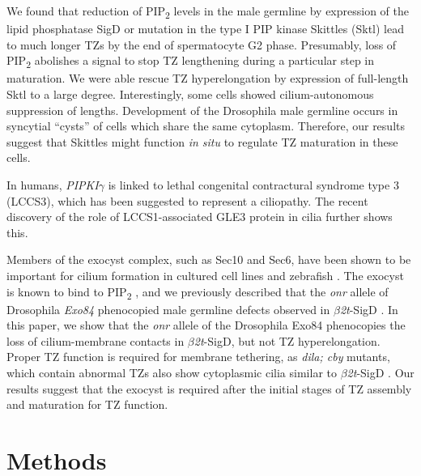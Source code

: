 \documentclass[12pt, twoside, letterpaper]{article}
\newcommand{\PIP}{PIP\textsubscript{2}}
\newcommand{\sigd}{$\beta$\textit{2t}-SigD}
\begin{document}
\begin{doublespacing}
\begin{linenumbers}
    We found that reduction of \PIP{} levels in the male germline by expression
    of the lipid phosphatase SigD or mutation in the type I PIP kinase
    Skittles (Sktl) lead to much longer TZs by the end of spermatocyte G2 phase.
    Presumably, loss of \PIP{} abolishes a signal to stop TZ lengthening during
    a particular step in maturation.
    We were able rescue TZ hyperelongation by expression of full-length Sktl to
    a large degree.
    Interestingly, some cells showed cilium-autonomous suppression of lengths.
    Development of the Drosophila male germline occurs in syncytial ``cysts''
    of cells which share the same cytoplasm.
    Therefore, our results suggest that Skittles might function \textit{in situ}
    to regulate TZ maturation in these cells.


    In humans, \textit{PIPKI$\gamma$} is linked to lethal congenital contractural
    syndrome type 3 (LCCS3), which has been suggested to represent a ciliopathy.
    The recent discovery of the role of LCCS1-associated GLE3 protein in cilia
    further shows this.


    Members of the exocyst complex, such as Sec10 and Sec6, have been shown
    to be important for cilium formation in cultured cell lines and zebrafish
    \citep{zuo2009exocyst, lobo2017exocyst, seixas2016arl13b}.
    The exocyst is known to bind to \PIP{}
    \citep{he2007exo70, zhang2008membrane}, and we previously described that
    the \textit{onr} allele of Drosophila \textit{Exo84} phenocopied
    male germline defects observed in \sigd{} \citep{fabian2010phosphatidylinositol}.
    In this paper, we show that the \textit{onr} allele of the Drosophila Exo84
    phenocopies the loss of cilium-membrane contacts in \sigd{},
    but not TZ hyperelongation.
    Proper TZ function is required for membrane tethering, as \textit{dila; cby}
    mutants, which contain abnormal TZs also show cytoplasmic cilia similar to
    \sigd{} \citep{vieillard2016transition}.
    Our results suggest that the exocyst is required after the initial stages
    of TZ assembly and maturation for TZ function.

    \section{Methods}

\end{linenumbers}
\end{doublespacing}
\end{document}
